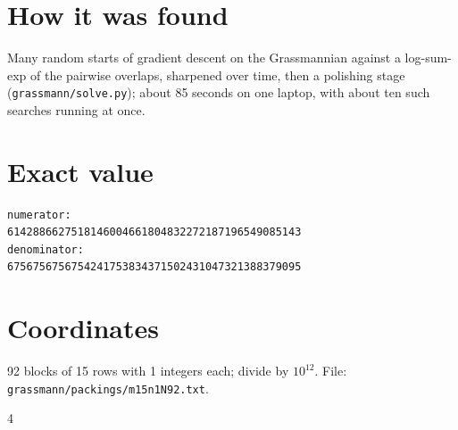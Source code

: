 \documentclass[11pt,a4paper]{article}
\begin{document}
\section{How it was found}
Many random starts of gradient descent on the Grassmannian against a log-sum-exp of the pairwise overlaps, sharpened over time, then a polishing stage (\texttt{grassmann/solve.py}); about 85 seconds on one laptop, with about ten such searches running at once.


\appendix
\section{Exact value}
{\small
\begin{verbatim}
numerator:
6142886627518146004661804832272187196549085143
denominator:
6756756756754241753834371502431047321388379095
\end{verbatim}}

\section{Coordinates}
92 blocks of 15 rows with 1 integers each; divide by $10^{12}$. File: \texttt{grassmann/packings/m15n1N92.txt}.
{\tiny
\begin{multicols}{4}
\end{multicols}}
\end{document}
